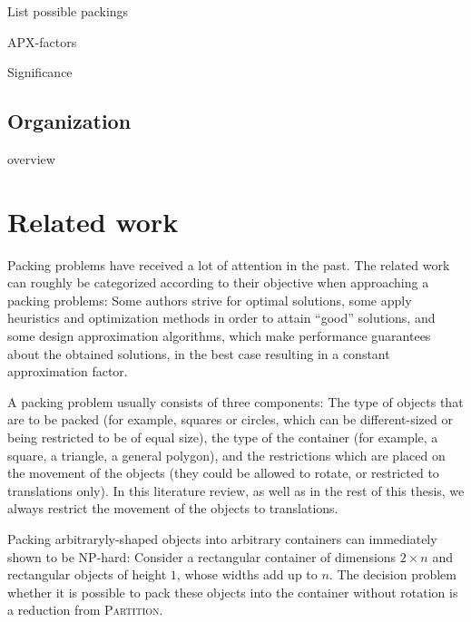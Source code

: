 \documentclass[a4paper,style=print,bibliography=totoc,nexus,lnum,extramargin]{tubsbook}
\begin{document}
List possible packings

APX-factors

Significance

%
%
%

\section{Organization}

overview

\chapter{Related work}

Packing problems have received a lot of attention in the past. The related work can roughly be categorized according to their objective when approaching a packing problems: Some authors strive for optimal solutions, some apply heuristics and optimization methods in order to attain “good” solutions, and some design approximation algorithms, which make performance guarantees about the obtained solutions, in the best case resulting in a constant approximation factor.

A packing problem usually consists of three components: The type of objects that are to be packed (for example, squares or circles, which can be different-sized or being restricted to be of equal size), the type of the container (for example, a square, a triangle, a general polygon), and the restrictions which are placed on the movement of the objects (they could be allowed to rotate, or restricted to translations only). In this literature review, as well as in the rest of this thesis, we always restrict the movement of the objects to translations.

Packing arbitraryly-shaped objects into arbitrary containers can immediately shown to be NP-hard: Consider a rectangular container of dimensions $2 \times n$ and rectangular objects of height $1$, whose widths add up to $n$. The decision problem whether it is possible to pack these objects into the container without rotation is a reduction from \textsc{Partition}.
\end{document}
